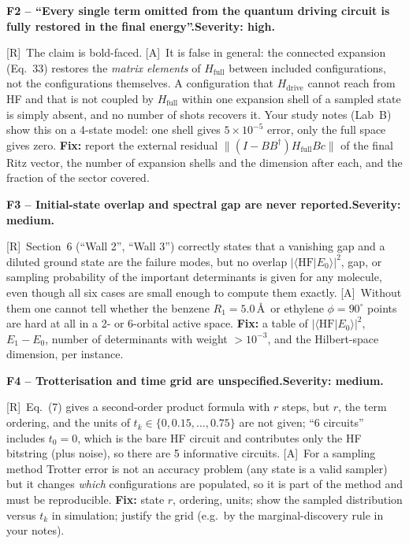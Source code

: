 \documentclass[11pt,a4paper]{article}
\newcommand{\braket}[2]{\langle #1\vert #2\rangle}
\newcommand{\Hd}{H_{\mathrm{drive}}}
\newcommand{\Ht}{H_{\mathrm{full}}}
\newcommand{\lR}{\textcolor{keyblue}{[R]}}   %
\newcommand{\lA}{\textcolor{notegray}{[A]}}  %
\newcommand{\sev}[1]{\textbf{Severity: #1.}}
\newcommand{\flaw}[4]{\par\medskip\noindent\textbf{#1 -- #2.}\quad{\small\textcolor{notegray}{Where: #3.}}\quad\sev{#4}\par\nobreak}
\begin{document}
\flaw{F2}{``Every single term omitted from the quantum driving circuit is fully restored in the final energy''}{p.~8, text after Eq.~(34)}{high}
\lR\ The claim is bold-faced. \lA\ It is false in general: the connected expansion (Eq.~33) restores the \emph{matrix elements} of $\Ht$ between included configurations, not the configurations themselves. A configuration that $\Hd$ cannot reach from HF and that is not coupled by $\Ht$ within one expansion shell of a sampled state is simply absent, and no number of shots recovers it. Your study notes (Lab~B) show this on a 4-state model: one shell gives $5\times10^{-5}$ error, only the full space gives zero. \textbf{Fix:} report the external residual $\|(I-BB^\dagger)\Ht Bc\|$ of the final Ritz vector, the number of expansion shells and the dimension after each, and the fraction of the sector covered.

\flaw{F3}{Initial-state overlap and spectral gap are never reported}{Sec.~3.4, pp.~7--8; Sec.~6, p.~12}{medium}
\lR\ Section~6 (``Wall 2'', ``Wall 3'') correctly states that a vanishing gap and a diluted ground state are the failure modes, but no overlap $|\braket{\mathrm{HF}}{E_0}|^2$, gap, or sampling probability of the important determinants is given for any molecule, even though all six cases are small enough to compute them exactly. \lA\ Without them one cannot tell whether the benzene $R_1=5.0$\,\AA\ or ethylene $\phi=90^\circ$ points are hard at all in a 2- or 6-orbital active space. \textbf{Fix:} a table of $|\braket{\mathrm{HF}}{E_0}|^2$, $E_1-E_0$, number of determinants with weight $>10^{-3}$, and the Hilbert-space dimension, per instance.

\flaw{F4}{Trotterisation and time grid are unspecified}{p.~4, Eq.~(7); p.~8, Eq.~(31)}{medium}
\lR\ Eq.~(7) gives a second-order product formula with $r$ steps, but $r$, the term ordering, and the units of $t_k\in\{0,0.15,\dots,0.75\}$ are not given; ``6 circuits'' includes $t_0=0$, which is the bare HF circuit and contributes only the HF bitstring (plus noise), so there are 5 informative circuits. \lA\ For a sampling method Trotter error is not an accuracy problem (any state is a valid sampler) but it changes \emph{which} configurations are populated, so it is part of the method and must be reproducible. \textbf{Fix:} state $r$, ordering, units; show the sampled distribution versus $t_k$ in simulation; justify the grid (e.g.\ by the marginal-discovery rule in your notes).
\end{document}
